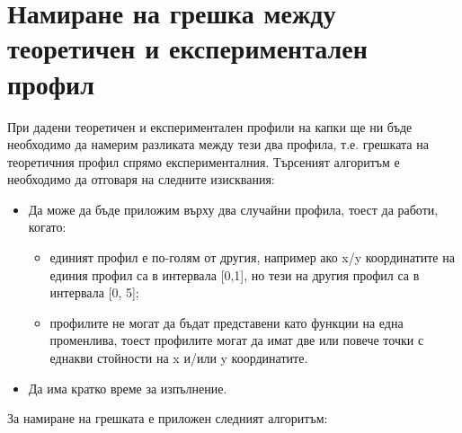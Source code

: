 \documentclass{article}
\begin{document}
\section{Намиране на грешка между теоретичен и експериментален профил}
При дадени теоретичен и експериментален профили на капки ще ни бъде необходимо да намерим разликата между тези два профила, т.е. грешката на теоретичния профил спрямо експерименталния. Търсеният алгоритъм е необходимо да отговаря на следните изисквания:
\begin{itemize}
    \item Да може да бъде приложим върху два случайни профила, тоест да работи, когато:
    \begin{itemize}
        \item единият профил е по-голям от другия, например ако x/y координатите на единия профил са в интервала [0,1], но тези на другия профил са в интервала [0, 5];
        \item профилите не могат да бъдат представени като функции на една променлива, тоест профилите могат да имат две или повече точки с еднакви стойности на x и/или y координатите.
    \end{itemize}
    \item Да има кратко време за изпълнение.
\end{itemize}
За намиране на грешката е приложен следният алгоритъм:
\renewcommand{\labelenumi}{\arabic{enumi}}
\end{document}
